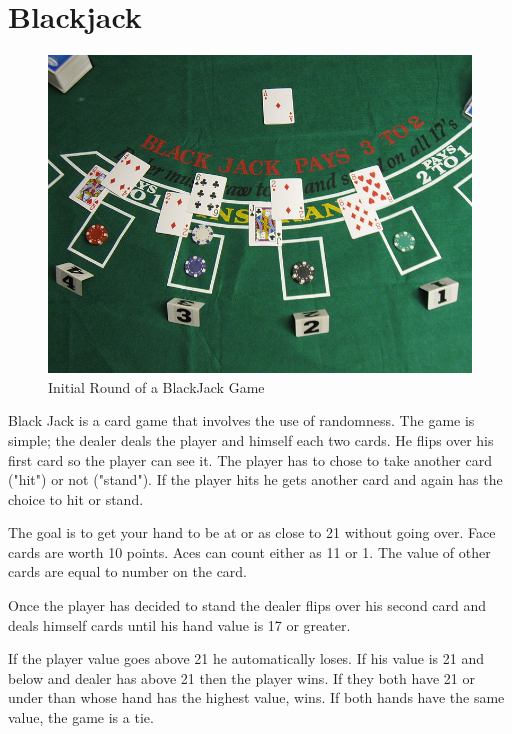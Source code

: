 \label{Ch:BJ}


\section*{Blackjack}

\begin{figure}[H]
\includegraphics[scale = .9]{Blackjack_game_1.jpg}
\caption{Initial Round of a BlackJack Game}
\end{figure}

Black Jack is a card game that involves the use of randomness.
The game is simple; the dealer deals the player and himself each two cards.
He flips over his first card so the player can see it.
The player has to chose to take another card ("hit") or not ("stand").
If the player hits he gets another card and again has the choice to hit or stand.

The goal is to get your hand to be at or as close to 21 without going over.
Face cards are worth 10 points.
Aces can count either as 11 or 1.
The value of other cards are equal to number on the card.

Once the player has decided to stand the dealer flips over his second card and deals himself cards until his hand value is 17 or greater. 

If the player value goes above 21 he automatically loses.
If his value is 21 and below and dealer has above 21 then the player wins.
If they both have 21 or under than whose hand has the highest value, wins.
If both hands have the same value, the game is a tie.

